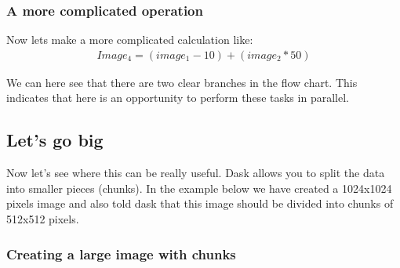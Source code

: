 \documentclass[letterpaper,10pt,english]{sphinxmanual}
\begin{document}
\subsubsection{A more complicated operation}
\label{\detokenize{01-Introduction:a-more-complicated-operation}}
\sphinxAtStartPar
Now lets make a more complicated calculation like:
\begin{equation*}
\begin{split}Image_4=(image_1-10)+(image_2*50)\end{split}
\end{equation*}
\begin{sphinxVerbatim}[commandchars=\\\{\}]
    
\end{sphinxVerbatim}

\noindent{}

\sphinxAtStartPar
We can here see that there are two clear branches in the flow chart. This indicates that here is an opportunity to perform these tasks in parallel.


\subsection{Let’s go big}
\label{\detokenize{01-Introduction:let-s-go-big}}
\sphinxAtStartPar
Now let’s see where this can be really useful. Dask allows you to split the data into smaller pieces (chunks). In the example below we have created a 1024x1024 pixels image and also told dask that this image should be divided into chunks of 512x512 pixels.


\subsubsection{Creating a large image with chunks}
\label{\detokenize{01-Introduction:creating-a-large-image-with-chunks}}
\begin{sphinxVerbatim}[commandchars=\\\{\}]
   
   
       
       
\end{sphinxVerbatim}
\end{document}
